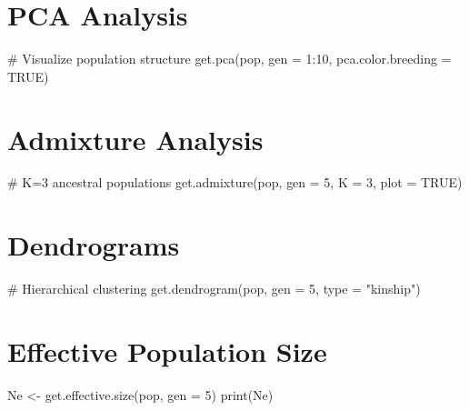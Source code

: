 \documentclass[
  letterpaper,
]{book}
\newenvironment{Shaded}{\begin{snugshade}}{\end{snugshade}}
\newcommand{\AttributeTok}[1]{\textcolor[rgb]{0.40,0.45,0.13}{#1}}
\newcommand{\CommentTok}[1]{\textcolor[rgb]{0.37,0.37,0.37}{#1}}
\newcommand{\ConstantTok}[1]{\textcolor[rgb]{0.56,0.35,0.01}{#1}}
\newcommand{\DecValTok}[1]{\textcolor[rgb]{0.68,0.00,0.00}{#1}}
\newcommand{\FunctionTok}[1]{\textcolor[rgb]{0.28,0.35,0.67}{#1}}
\newcommand{\NormalTok}[1]{\textcolor[rgb]{0.00,0.23,0.31}{#1}}
\newcommand{\OtherTok}[1]{\textcolor[rgb]{0.00,0.23,0.31}{#1}}
\newcommand{\SpecialCharTok}[1]{\textcolor[rgb]{0.37,0.37,0.37}{#1}}
\newcommand{\StringTok}[1]{\textcolor[rgb]{0.13,0.47,0.30}{#1}}
\begin{document}
\section{PCA Analysis}\label{pca-analysis}

\begin{Shaded}
\begin{Highlighting}[]
\CommentTok{\# Visualize population structure}
\FunctionTok{get.pca}\NormalTok{(pop, }\AttributeTok{gen =} \DecValTok{1}\SpecialCharTok{:}\DecValTok{10}\NormalTok{, }\AttributeTok{pca.color.breeding =} \ConstantTok{TRUE}\NormalTok{)}
\end{Highlighting}
\end{Shaded}

\section{Admixture Analysis}\label{admixture-analysis}

\begin{Shaded}
\begin{Highlighting}[]
\CommentTok{\# K=3 ancestral populations}
\FunctionTok{get.admixture}\NormalTok{(pop, }\AttributeTok{gen =} \DecValTok{5}\NormalTok{, }\AttributeTok{K =} \DecValTok{3}\NormalTok{, }\AttributeTok{plot =} \ConstantTok{TRUE}\NormalTok{)}
\end{Highlighting}
\end{Shaded}

\section{Dendrograms}\label{dendrograms}

\begin{Shaded}
\begin{Highlighting}[]
\CommentTok{\# Hierarchical clustering}
\FunctionTok{get.dendrogram}\NormalTok{(pop, }\AttributeTok{gen =} \DecValTok{5}\NormalTok{, }\AttributeTok{type =} \StringTok{"kinship"}\NormalTok{)}
\end{Highlighting}
\end{Shaded}

\section{Effective Population Size}\label{effective-population-size}

\begin{Shaded}
\begin{Highlighting}[]
\NormalTok{Ne }\OtherTok{\textless{}{-}} \FunctionTok{get.effective.size}\NormalTok{(pop, }\AttributeTok{gen =} \DecValTok{5}\NormalTok{)}
\FunctionTok{print}\NormalTok{(Ne)}
\end{Highlighting}
\end{Shaded}
\end{document}
